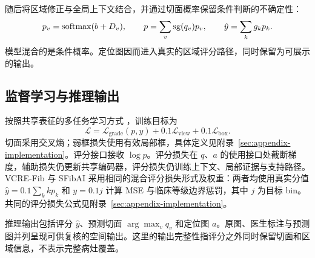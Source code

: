 随后将区域修正与全局上下文结合，并通过切面概率保留条件判断的不确定性：
\begin{equation}
p_v=\operatorname{softmax}(b+D_v),\qquad
p=\sum_v\operatorname{sg}(q_v)p_v,\qquad
\hat y=\sum_k g_kp_k.
\label{eq:mixture}
\end{equation}
模型混合的是条件概率。定位图因而进入真实的区域评分路径，同时保留为可展示的输出。

\subsection{监督学习与推理输出}
按照共享表征的多任务学习方式 \citep{caruana1997multitask}，训练目标为
\begin{equation}
\mathcal L=\mathcal L_{\mathrm{grade}}(p,y)+0.1\mathcal L_{\mathrm{view}}+0.1\mathcal L_{\mathrm{box}}.
\label{eq:loss}
\end{equation}
切面采用交叉熵；弱框损失使用有效局部框，具体定义见附录~\ref{sec:appendix-implementation}。评分接口接收 $\log p$。评分损失在 $q$、$a$ 的使用接口处截断梯度，辅助损失仍更新共享编码器，评分损失仍训练上下文、局部证据与支持路径。VCRE-Fib 与 SFibAI 采用相同的混合评分损失形式及权重：两者均使用真实分值 $\hat y=0.1\sum_k kp_k$ 和 $y=0.1j$ 计算 MSE 与临床等级边界惩罚，其中 $j$ 为目标 bin。共同的评分损失公式见附录~\ref{sec:appendix-implementation}。

推理输出包括评分 $\hat y$、预测切面 $\arg\max_v q_v$ 和定位图 $a$。原图、医生标注与预测图并列呈现可供复核的空间输出。这里的输出完整性指评分之外同时保留切面和区域信息，不表示完整病灶覆盖。
